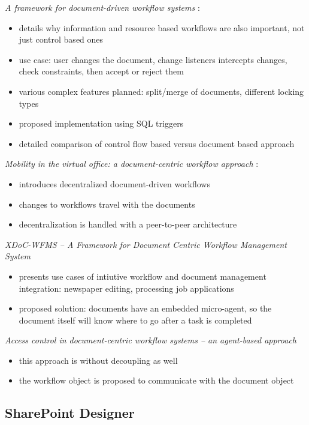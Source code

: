 \emph{A framework for document-driven workflow systems} \cite{paper-framework}:
\begin{itemize}
\item details why information and resource based workflows are also important, not just control based ones
\item use case: user changes the document, change listeners intercepts changes, check constraints, then accept or reject them
\item various complex features planned: split/merge of documents, different locking types
\item proposed implementation using SQL triggers
\item detailed comparison of control flow based versus document based approach
\end{itemize}

\emph{Mobility in the virtual office: a document-centric workflow approach} \cite{paper-mobility}:
\begin{itemize}
\item introduces decentralized document-driven workflows
\item changes to workflows travel with the documents
\item decentralization is handled with a peer-to-peer architecture
\end{itemize}

\emph{XDoC-WFMS -- A Framework for Document Centric Workflow Management System} \cite{paper-xdoc}
\begin{itemize}
\item presents use cases of intiutive workflow and document management integration: newspaper editing, processing job applications
\item proposed solution: documents have an embedded micro-agent, so the document itself will know where to go after a task is completed
\end{itemize}

\emph{Access control in document-centric workflow systems -- an agent-based approach} \cite{paper-access}
\begin{itemize}
\item this approach is without decoupling as well
\item the workflow object is proposed to communicate with the document object
\end{itemize}

\subsection*{SharePoint Designer}

